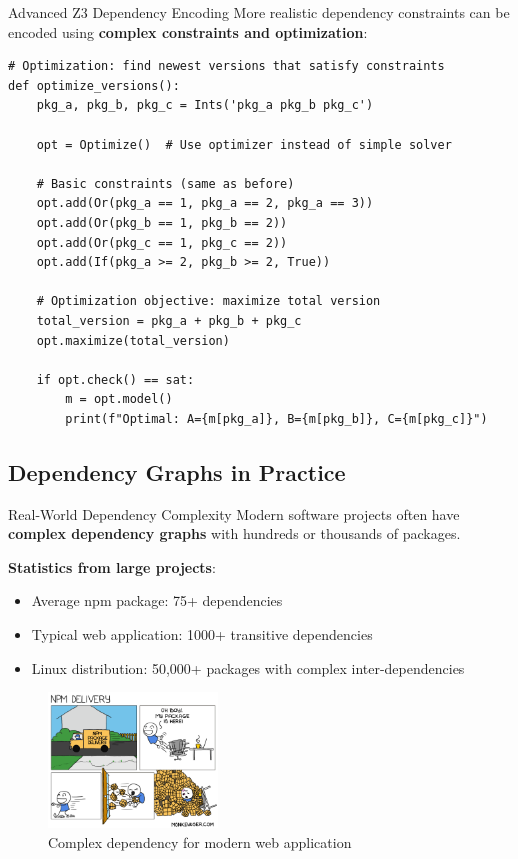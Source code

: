 \documentclass{beamer}
\begin{document}
\begin{frame}[fragile,t]{Advanced Z3 Dependency Encoding}
More realistic dependency constraints can be encoded using \textbf{complex constraints and optimization}:

\begin{verbatim}
# Optimization: find newest versions that satisfy constraints
def optimize_versions():
    pkg_a, pkg_b, pkg_c = Ints('pkg_a pkg_b pkg_c')
    
    opt = Optimize()  # Use optimizer instead of simple solver
    
    # Basic constraints (same as before)
    opt.add(Or(pkg_a == 1, pkg_a == 2, pkg_a == 3))
    opt.add(Or(pkg_b == 1, pkg_b == 2))
    opt.add(Or(pkg_c == 1, pkg_c == 2))
    opt.add(If(pkg_a >= 2, pkg_b >= 2, True))
    
    # Optimization objective: maximize total version
    total_version = pkg_a + pkg_b + pkg_c
    opt.maximize(total_version)
    
    if opt.check() == sat:
        m = opt.model()
        print(f"Optimal: A={m[pkg_a]}, B={m[pkg_b]}, C={m[pkg_c]}")
\end{verbatim}
\end{frame}

\subsection{Dependency Graphs in Practice}

\begin{frame}[t]{Real-World Dependency Complexity}
Modern software projects often have \textbf{complex dependency graphs} with hundreds or thousands of packages.

\bigskip

\textbf{Statistics from large projects}:
\begin{itemize}
\item Average npm package: 75+ dependencies
\item Typical web application: 1000+ transitive dependencies
\item Linux distribution: 50,000+ packages with complex inter-dependencies
\end{itemize}

\bigskip

\begin{figure}
\centering
\includegraphics[width=0.4\textwidth]{images/52-npm-delivery.png}
\caption{Complex dependency for modern web application}
\end{figure}
\end{frame}
\end{document}
